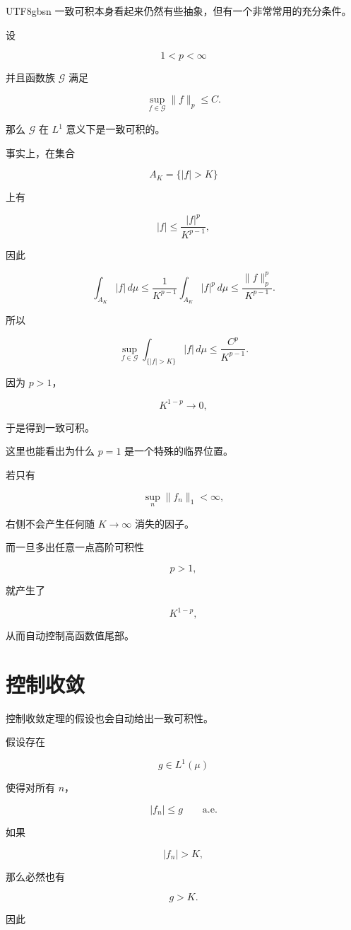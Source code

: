 \documentclass[11pt]{article}
\begin{document}
\begin{CJK*}{UTF8}{gbsn}
一致可积本身看起来仍然有些抽象，但有一个非常常用的充分条件。

设

\[
1<p<\infty
\]

并且函数族 $\mathcal G$ 满足

\[
\sup_{f\in\mathcal G}\|f\|_p\leq C.
\]

那么 $\mathcal G$ 在 $L^1$ 意义下是一致可积的。

事实上，在集合

\[
A_K=\{|f|>K\}
\]

上有

\[
|f|
\leq
\frac{|f|^p}{K^{p-1}},
\]

因此

\[
\int_{A_K}|f|\,d\mu
\leq
\frac1{K^{p-1}}
\int_{A_K}|f|^p\,d\mu
\leq
\frac{\|f\|_p^p}{K^{p-1}}.
\]

所以

\[
\sup_{f\in\mathcal G}
\int_{\{|f|>K\}}|f|\,d\mu
\leq
\frac{C^p}{K^{p-1}}.
\]

因为 $p>1$，

\[
K^{1-p}\to0,
\]

于是得到一致可积。

这里也能看出为什么 $p=1$ 是一个特殊的临界位置。

若只有

\[
\sup_n\|f_n\|_1<\infty,
\]

右侧不会产生任何随 $K\to\infty$ 消失的因子。

而一旦多出任意一点高阶可积性

\[
p>1,
\]

就产生了

\[
K^{1-p},
\]

从而自动控制高函数值尾部。


\section{控制收敛}


控制收敛定理的假设也会自动给出一致可积性。

假设存在

\[
g\in L^1(\mu)
\]

使得对所有 $n$，

\[
|f_n|\leq g
\qquad\text{a.e.}
\]

如果

\[
|f_n|>K,
\]

那么必然也有

\[
g>K.
\]

因此


\end{CJK*}
\end{document}
